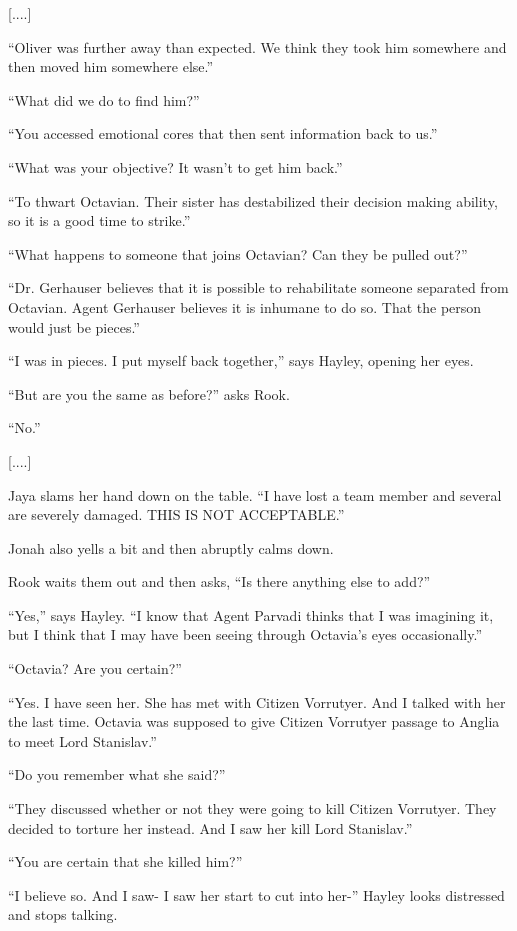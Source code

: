 {[}....{]}

``Oliver was further away than expected.  We think they took him somewhere and then moved him somewhere else.''

``What did we do to find him?''

``You accessed emotional cores that then sent information back to us.''

``What was your objective?  It wasn't to get him back.''

``To thwart Octavian.  Their sister has destabilized their decision making ability, so it is a good time to strike.''

``What happens to someone that joins Octavian?  Can they be pulled out?''

``Dr. Gerhauser believes that it is possible to rehabilitate someone separated from Octavian.  Agent Gerhauser believes it is inhumane to do so.  That the person would just be pieces.''

``I was in pieces.  I put myself back together,'' says Hayley, opening her eyes.

``But are you the same as before?'' asks Rook.

``No.''

{[}....{]}

Jaya slams her hand down on the table.  ``I have lost a team member and several are severely damaged.  THIS IS NOT ACCEPTABLE.''

Jonah also yells a bit and then abruptly calms down.



Rook waits them out and then asks, ``Is there anything else to add?''

``Yes,'' says Hayley.  ``I know that Agent Parvadi thinks that I was imagining it, but I think that I may have been seeing through Octavia's eyes occasionally.''

``Octavia?  Are you certain?''

``Yes.  I have seen her.  She has met with Citizen Vorrutyer.  And I talked with her the last time.  Octavia was supposed to give Citizen Vorrutyer passage to Anglia to meet Lord Stanislav.''

``Do you remember what she said?''

``They discussed whether or not they were going to kill Citizen Vorrutyer.  They decided to torture her instead.  And I saw her kill Lord Stanislav.''

``You are certain that she killed him?''

``I believe so.  And I saw- I saw her start to cut into her-'' Hayley looks distressed and stops talking. 

